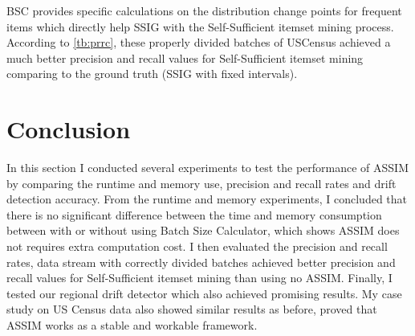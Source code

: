 BSC provides specific calculations on the distribution change points for frequent items which directly help SSIG with the Self-Sufficient itemset mining process. According to \ref{tb:prrc}, these properly divided batches of USCensus achieved a much better precision and recall values for Self-Sufficient itemset mining comparing to the ground truth (SSIG with fixed intervals).

\begin{table}[h!]
\caption{Precision and Recall for USCensus}
\label{tb:prrc}
\begin{center}
\end{center}
\end{table}


\section{Conclusion}

In this section I conducted several experiments to test the performance of ASSIM by comparing the runtime and memory use, precision and recall rates and drift detection accuracy. From the runtime and memory experiments, I concluded that there is no significant difference between the time and memory consumption between with or without using Batch Size Calculator, which shows ASSIM does not requires extra computation cost. I then evaluated the precision and recall rates, data stream with correctly divided batches achieved better precision and recall values for Self-Sufficient itemset mining than using no ASSIM. Finally, I tested our regional drift detector which also achieved promising results. My case study on US Census data also showed similar results as before, proved that ASSIM works as a stable and workable framework.

